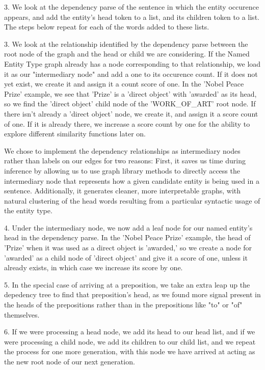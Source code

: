 \documentclass[11pt,a4paper]{article}
\begin{document}
3. We look at the dependency parse of the sentence in which the entity occurence appears, and add the entity's head token to a list, and its children token to a list. The steps below repeat for each of the words added to these lists.

3. We look at the relationship identified by the dependency parse between the root node of the graph and the head or child we are considering. If the Named Entity Type graph already has a node corresponding to that relationship, we load it as our "intermediary node" and add a one to its occurence count. If it does not yet exist, we create it and assign it a count score of one. In the 'Nobel Peace Prize' example, we see that 'Prize' is a 'direct object' with 'awarded' as its head, so we find the 'direct object' child node of the 'WORK\_OF\_ART' root node. If there isn't already a 'direct object' node, we create it, and assign it a score count of one. If it is already there, we increase a score count by one for the ability to explore different similarity functions later on.

We chose to implement the dependency relationships as intermediary nodes rather than labels on our edges for two reasons: First, it saves us time during inference by allowing us to use graph library methods to directly access the intermediary node that represents how a given candidate entity is being used in a sentence. Additionally, it generates cleaner, more interpretable graphs, with natural clustering of the head words resulting from a particular syntactic usage of the entity type.

4. Under the intermediary node, we now add a leaf node for our named entity's head in the dependency parse. In the 'Nobel Peace Prize' example, the head of 'Prize' when it was used as a direct object is 'awarded,' so we create a node for 'awarded' as a child node of 'direct object' and give it a score of one, unless it already exists, in which case we increase its score by one.

5. In the special case of arriving at a preposition, we take an extra leap up the depedency tree to find that preposition's head, as we found more signal present in the heads of the prepositions rather than in the prepositions like "to" or "of" themselves.

6. If we were processing a head node, we add its head to our head list, and if we were processing a child node, we add its children to our child list, and we repeat the process for one more generation, with this node we have arrived at acting as the new root node of our next generation.
\end{document}
